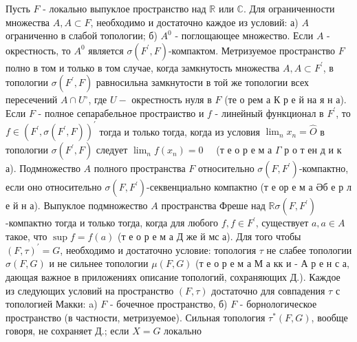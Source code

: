 \documentclass[10pt]{article}
\begin{document}
Пусть $F$ - локально выпуклое пространство над $\mathbb{R}$ или $\mathbb{C}$. Для ограниченности множества $A, A \subset F$, необходимо и достаточно каждое из условий: а) $A$ ограниченно в слабой топологии; б) $A^{0}$ - поглощающее множество. Если $A$ - окрестность, то $A^{0}$ является $\sigma\left(F^{\prime}, F\right)$-компактом. Метризуемое пространство $F$ полно в том и только в том случае, когда замкнутость множества $A, A \subset F^{\prime}$, в топологии $\sigma\left(F^{\prime}, F\right)$ равносильна замкнутости в той же топологии всех пересечений $A \cap U^{\circ}$, где $U-$ окрестность нуля в $F$ (те о рем а К р е й на я н а). Если $F$ - полное сепарабельное простраиство и $f$ - линейный функционал в $F^{\prime}$, то $f \in\left(F^{\prime}, \sigma\left(F^{\prime}, F\right)\right)^{\prime}$ тогда и только тогда, когда из условия $\lim _{n} x_{n}=\widehat{O}$ в топологии $\sigma\left(F^{\prime}, F\right)$ следует $\lim _{n} f\left(x_{n}\right)=0 \quad$ (т е о р е м а $\Gamma$ р о т ен д и к а). Подмножество $A$ полного пространства $F$ относительно $\sigma\left(F, F^{\prime}\right)$-компактно, если оно относительно $\sigma\left(F, F^{\prime}\right)$-секвенциально компактно (т е ор е м а Әб е р л е й н а). Выпуклое подмножество $A$ пространства Фреше над $\mathbb{R} \sigma\left(F, F^{\prime}\right)$-компактно тогда и только тогда, когда для любого $f, f \in F^{\prime}$, существует $a, a \in A$ такое, что $\sup f=f(a)$ (т е о р е м а Д же й мс а). Для того чтобы $(F, \tau)^{\prime}=G$, необходимо и достаточно условие: топология $\tau$ не слабее топологии $\sigma(F, G)$ и не сильнее топологии $\mu(F, G)$ (т е о р е м а М а кк и - А р е н с а, дающая важное в приложениях описание топологий, сохраняющих Д.). Каждое из следующих условий на пространство $(F, \tau)$ достаточно для совпадения $\tau$ с топологией Макки: a) $F$ - бочечное пространство, б) $F$ - борнологическое пространство (в частности, метризуемое). Сильная топология $\tau^{*}(F, G)$, вообще говоря, не сохраняет Д.; если $X=G$ локально
\end{document}

